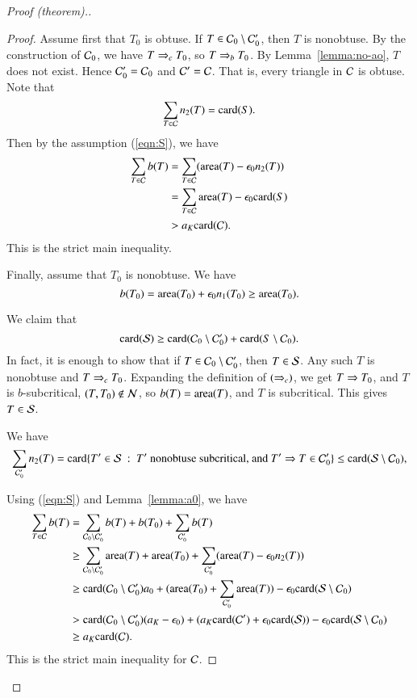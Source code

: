 \begin{proof}[Proof (theorem).]
\begin{proof}
  Assume first that $T_0$ is obtuse.  If $T\in \C_0\setminus \C_0'$,
  then $T$ is nonobtuse.  By the construction of $\C_0$, we have
  $T\ra{c} T_0$, so $T\ra{b} T_0$.  By Lemma~\ref{lemma:no-ao}, $T$
  does not exist.  Hence $\C_0' = \C_0$ and $\C'=\C$.  That is, every
  triangle in $\C$ is obtuse.  Note that
\[
\sum_{T\in \C} n_2(T) = \card(S).
\]
Then by the assumption (\ref{eqn:S}), we have
\begin{align*}
\sum_{T\in \C} b(T) &=\sum_{T\in \C} (\area(T) - \epso n_2(T)) \\
&= \sum_{T\in \C} \area(T) - \epso \card(S) \\
&> a_K \card(\C).
\end{align*}
This is the strict main inequality.

Finally, assume that $T_0$ is nonobtuse.  We have
\[
b(T_0) = \area(T_0) + \epso n_1(T_0) \ge \area(T_0).
\]

We claim that 
\[
\card(\S) \ge \card(\C_0 \setminus \C_0') + \card(S\setminus \C_0).
\]
In fact, it is enough to show that if $T\in \C_0\setminus \C_0'$, then
$T\in \S$.  Any such $T$ is nonobtuse and $T\ra{c}T_0$.  Expanding
the definition of $(\ra{c})$, we get $T\Ra T_0$, and $T$ is
$b$-subcritical, $(T,T_0)\not\in\N$, so $b(T) = \area(T)$, and $T$ is
subcritical.   This gives $T\in \S$.

We have
\[
\sum_{\C_0'} n_2(T) = \card\{T'\in\S \mid T' \text{ nonobtuse
  subcritical, and } T'\Ra T\in \C_0' \} \le \card(\S\setminus \C_0 ),
\]

Using (\ref{eqn:S}) and Lemma~\ref{lemma:a0}, we have
\begin{align*}
\sum_{T\in \C} b(T) &= \sum_{\C_0\setminus \C_0'} b(T) + b(T_0) +
\sum_{\C_0'} b(T) \\
&\ge \sum_{\C_0\setminus \C_0'} \area(T) + \area(T_0) +
\sum_{\C_0'} (\area(T) - \epso n_2(T)) \\
&\ge \card({\C_0\setminus \C_0'}) a_0 + (\area(T_0) +
\sum_{\C_0'} \area(T)) - \epso \card(\S\setminus \C_0)\\
&> \card({\C_0\setminus \C_0'}) (\aK  - \epso) + (\aK \card(\C') +
\epso \card(\S)) - \epso \card(\S\setminus \C_0)\\
&\ge a_K \card(\C).
\end{align*}
This is the strict main inequality for $\C$.
\end{proof}


\end{proof}
